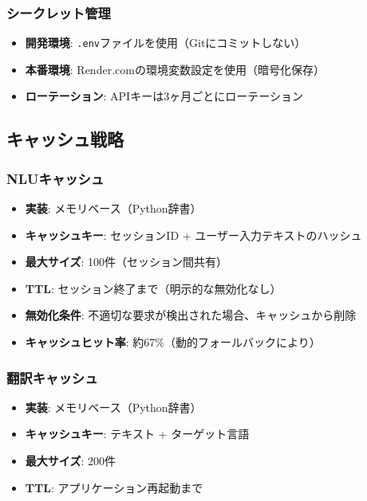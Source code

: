 \documentclass[a4paper,11pt,ja=standard,xelatex]{bxjsarticle}
\theoremstyle{definition}
\begin{document}
\subsubsection{シークレット管理}

\begin{itemize}
\item \textbf{開発環境}: \texttt{.env}ファイルを使用（Gitにコミットしない）
\item \textbf{本番環境}: Render.comの環境変数設定を使用（暗号化保存）
\item \textbf{ローテーション}: APIキーは3ヶ月ごとにローテーション
\end{itemize}

\subsection{キャッシュ戦略}

\subsubsection{NLUキャッシュ}

\begin{itemize}
\item \textbf{実装}: メモリベース（Python辞書）
\item \textbf{キャッシュキー}: セッションID + ユーザー入力テキストのハッシュ
\item \textbf{最大サイズ}: 100件（セッション間共有）
\item \textbf{TTL}: セッション終了まで（明示的な無効化なし）
\item \textbf{無効化条件}: 不適切な要求が検出された場合、キャッシュから削除
\item \textbf{キャッシュヒット率}: 約67\%（動的フォールバックにより）
\end{itemize}

\subsubsection{翻訳キャッシュ}

\begin{itemize}
\item \textbf{実装}: メモリベース（Python辞書）
\item \textbf{キャッシュキー}: テキスト + ターゲット言語
\item \textbf{最大サイズ}: 200件
\item \textbf{TTL}: アプリケーション再起動まで
\end{itemize}
\end{document}
